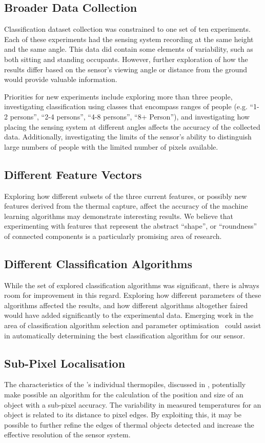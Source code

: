 \documentclass[../thesis/thesis.tex]{subfiles}
\begin{document}
\subsection{Broader Data Collection}
Classification dataset collection was constrained to one set of ten experiments. Each of these experiments had the sensing system recording at the same height and the same angle. This data did contain some elements of variability, such as both sitting and standing occupants. However, further exploration of how the results differ based on the sensor's viewing angle or distance from the ground would provide valuable information.

Priorities for new experiments include exploring more than three people, investigating classification using classes that encompass ranges of people (e.g. ``1-2 persons'', ``2-4 persons'', ``4-8 persons'', ``8+ Person''), and investigating how placing the sensing system at different angles affects the accuracy of the collected data. Additionally, investigating the limits of the sensor's ability to distinguish large numbers of people with the limited number of pixels available.

\subsection{Different Feature Vectors}
Exploring how different subsets of the three current features, or possibly new features derived from the thermal capture, affect the accuracy of the machine learning algorithms may demonstrate interesting results. We believe that experimenting with features that represent the abstract ``shape'', or ``roundness'' of connected components is a particularly promising area of research.

\subsection{Different Classification Algorithms}
While the set of explored classification algorithms was significant, there is always room for improvement in this regard. Exploring how different parameters of these algorithms affected the results, and how different algorithms altogether faired would have added significantly to the experimental data. Emerging work in the area of classification algorithm selection and parameter optimisation~\cite{thornton2013auto} could assist in automatically determining the best classification algorithm for our sensor.

\subsection{Sub-Pixel Localisation}
The  characteristics of the \mlx's individual thermopiles, discussed in , potentially make possible an algorithm for the calculation of the position and size of an object with a sub-pixel accuracy. The variability in measured temperatures for an object is related to its distance to pixel edges. By exploiting this, it may be possible to further refine the edges of thermal objects detected and increase the effective resolution of the sensor system.
\end{document}
